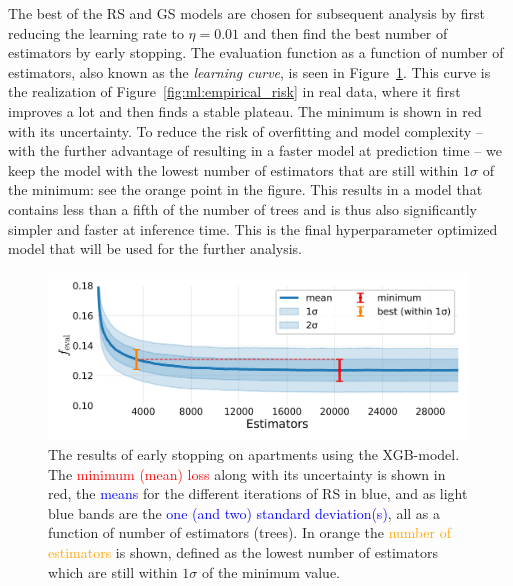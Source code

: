The best of the RS and GS models are chosen for subsequent analysis by first reducing the learning rate to $\eta=0.01$ and then find the best number of estimators by early stopping. The evaluation function as a function of number of estimators, also known as the \emph{learning curve}, is seen in Figure~\ref{fig:h:CV_res_ES_learning_curve_ejer}. This curve is the realization of Figure~\ref{fig:ml:empirical_risk} in real data, where it first improves a lot and then finds a stable plateau. The minimum is shown in red with its uncertainty. To reduce the risk of overfitting and model complexity -- with the further advantage of resulting in a faster model at prediction time -- we keep the model with the lowest number of estimators that are still within $1\sigma$ of the minimum: see the orange point in the figure. This results in a model that contains less than a fifth of the number of trees and is thus also significantly simpler and faster at inference time. This is the final hyperparameter optimized model that will be used for the further analysis. 

\begin{figure}
  \centerfloat
  \includegraphics[draft=false, width=0.99\textwidth, trim=0 0 0 0, clip]{figures/housing/Ejerlejlighed_v19_cut_all_Ncols_all_xgb_early_stopping_fig.png}
  \caption[Early Stopping results]
          {The results of early stopping on apartments using the XGB-model. The \textcolor{red}{minimum (mean) loss} along with its uncertainty is shown in red, the \textcolor{blue}{means} for the different iterations of RS in blue, and as light blue bands are the \textcolor{blue}{one (and two) standard deviation(s)}, all as a function of number of estimators (trees). In orange the \textcolor{orange}{ number of estimators} is shown, defined as the lowest number of estimators which are still within $1\sigma$ of the minimum value.} 
  \label{fig:h:CV_res_ES_learning_curve_ejer}
\end{figure}








